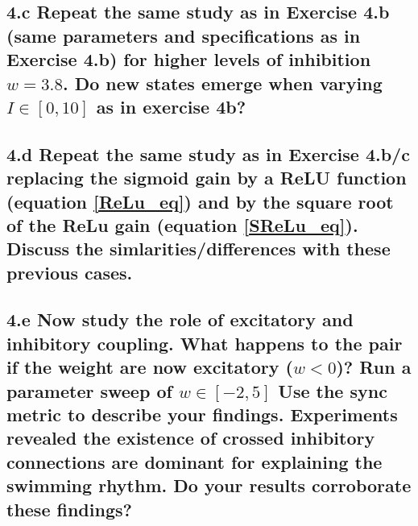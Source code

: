 \documentclass{cmc}
\begin{document}
\subsection*{4.c Repeat the same study as in Exercise 4.b (same parameters and specifications as in
Exercise 4.b) for higher levels of inhibition $w=3.8$. Do new states emerge when varying $I \in [0,10]$ as in exercise 4b?}




\subsection*{4.d Repeat the same study as in Exercise 4.b/c replacing the sigmoid gain by a ReLU
 function (equation \ref{ReLu_eq}) and by the square root of the ReLu gain (equation \ref{SReLu_eq}). Discuss the simlarities/differences with these previous cases.}




\subsection*{4.e Now study the role of excitatory and inhibitory coupling. What happens to the pair if the weight
 are now excitatory ($w<0$)? Run a parameter sweep of $w \in [-2,5]$ Use the sync metric to describe your findings. Experiments revealed the existence of crossed inhibitory connections are dominant for explaining the swimming rhythm. Do your results corroborate these findings? }
\end{document}
